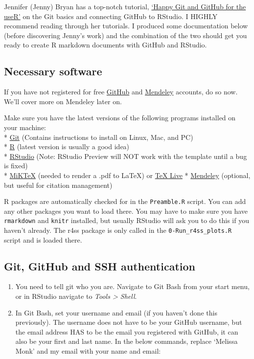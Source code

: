 \documentclass[12pt,]{article}
\begin{document}
Jennifer (Jenny) Bryan has a top-notch tutorial,
\href{http://happygitwithr.com/}{`Happy Git and GitHub for the useR'} on
the Git basics and connecting GitHub to RStudio. I HIGHLY recommend
reading through her tutorials. I produced some documentation below
(before discovering Jenny's work) and the combination of the two should
get you ready to create R markdown documents with GitHub and RStudio.

\subsection{Necessary software}\label{necessary-software}

If you have not registered for free \href{https://github.com}{GitHub}
and \href{www.mendeley.com}{Mendeley} accounts, do so now. We'll cover
more on Mendeley later on.

Make sure you have the latest versions of the following programs
installed on your machine:\\
 *
\href{https://git-scm.com/book/en/v2/Getting-Started-Installing-Git}{Git}
(Contains instructions to install on Linux, Mac, and PC)\\
 * \href{https://cran.r-project.org/bin/windows/base/}{R} (latest
version is usually a good idea)\\
 * \href{https://www.rstudio.com/products/rstudio/download3/}{RStudio}
(Note: RStudio Preview will NOT work with the template until a bug is
fixed)\\
 * \href{http://miktex.org/}{MiKTeX} (needed to render a .pdf to LaTeX)
or \href{https://www.tug.org/texlive/}{TeX Live} *
\href{https://www.mendeley.com/}{Mendeley} (optional, but useful for
citation management)

R packages are automatically checked for in the \texttt{Preamble.R}
script. You can add any other packages you want to load there. You may
have to make sure you have \texttt{rmarkdown} and \texttt{knitr}
installed, but usually RStudio will ask you to do this if you haven't
already. The r4ss package is only called in the
\texttt{0-Run\_r4ss\_plots.R} script and is loaded there.

\subsection{Git, GitHub and SSH
authentication}\label{git-github-and-ssh-authentication}

\begin{enumerate}
\def\labelenumi{\arabic{enumi}.}
\item
  You need to tell git who you are. Navigate to Git Bash from your start
  menu, or in RStudio navigate to \emph{Tools \textgreater{} Shell}.
\item
  In Git Bash, set your username and email (if you haven't done this
  previously). The username does not have to be your GitHub username,
  but the email address HAS to be the email you registered with GitHub,
  it can also be your first and last name. In the below commands,
  replace `Melissa Monk' and my email with your name and email:
\end{enumerate}
\end{document}
